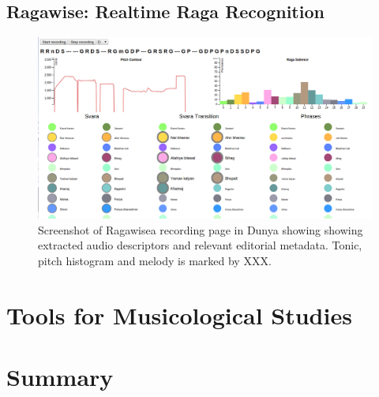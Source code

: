 \subsection{Ragawise: Realtime Raga Recognition}
\label{sec:ragawise}

\begin{figure}
	\begin{center}
		\includegraphics[width=\figSizeHundred]{ch08_applications/figures/ragawise.png}
	\end{center}
	\caption{Screenshot of Ragawisea recording page in Dunya showing showing extracted audio descriptors and relevant editorial metadata. Tonic, pitch histogram and melody is marked by XXX.}
	\label{fig:dunya_recording}
\end{figure}


\section{Tools for Musicological Studies}

\section{Summary}



